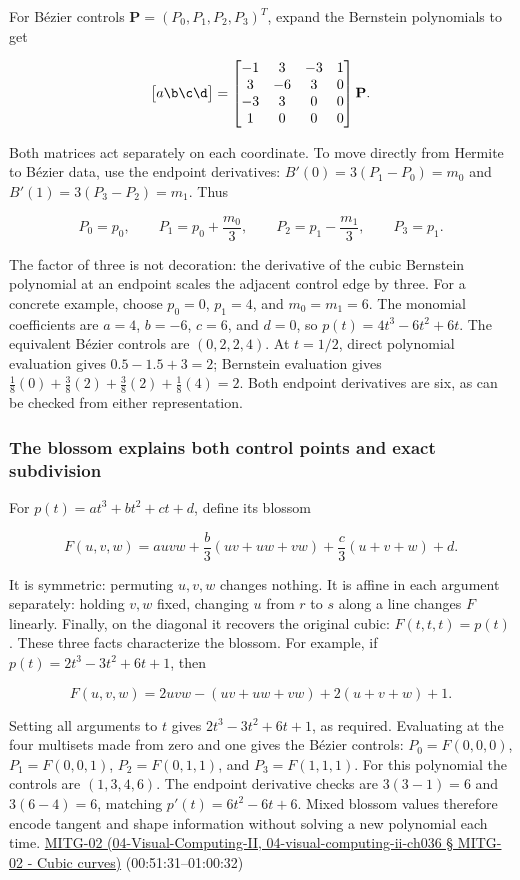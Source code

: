 For Bézier controls \(\mathbf{P}=(P_0,P_1,P_2,P_3)^T\), expand the Bernstein polynomials to get

\[
\begin{bmatrix}a\b\c\d\end{bmatrix}=
\begin{bmatrix}
-1&3&-3&1\\
3&-6&3&0\\
-3&3&0&0\\
1&0&0&0
\end{bmatrix}\mathbf{P}.
\]

Both matrices act separately on each coordinate. To move directly from Hermite to Bézier data, use the endpoint derivatives: \(B'(0)=3(P_1-P_0)=m_0\) and \(B'(1)=3(P_3-P_2)=m_1\). Thus

\[
P_0=p_0,\qquad P_1=p_0+\frac{m_0}{3},\qquad
P_2=p_1-\frac{m_1}{3},\qquad P_3=p_1.
\]

The factor of three is not decoration: the derivative of the cubic Bernstein polynomial at an endpoint scales the adjacent control edge by three. For a concrete example, choose \(p_0=0\), \(p_1=4\), and \(m_0=m_1=6\). The monomial coefficients are \(a=4\), \(b=-6\), \(c=6\), and \(d=0\), so \(p(t)=4t^3-6t^2+6t\). The equivalent Bézier controls are \((0,2,2,4)\). At \(t=1/2\), direct polynomial evaluation gives \(0.5-1.5+3=2\); Bernstein evaluation gives \(\frac18(0)+\frac38(2)+\frac38(2)+\frac18(4)=2\). Both endpoint derivatives are six, as can be checked from either representation.

\subsubsection{The blossom explains both control points and exact subdivision}\label{the-blossom-explains-both-control-points-and-exact-subdivision}

For \(p(t)=at^3+bt^2+ct+d\), define its blossom

\[
F(u,v,w)=a uvw+\frac b3(uv+uw+vw)+\frac c3(u+v+w)+d.
\]

It is symmetric: permuting \(u,v,w\) changes nothing. It is affine in each argument separately: holding \(v,w\) fixed, changing \(u\) from \(r\) to \(s\) along a line changes \(F\) linearly. Finally, on the diagonal it recovers the original cubic: \(F(t,t,t)=p(t)\). These three facts characterize the blossom. For example, if \(p(t)=2t^3-3t^2+6t+1\), then

\[
F(u,v,w)=2uvw-(uv+uw+vw)+2(u+v+w)+1.
\]

Setting all arguments to \(t\) gives \(2t^3-3t^2+6t+1\), as required. Evaluating at the four multisets made from zero and one gives the Bézier controls: \(P_0=F(0,0,0)\), \(P_1=F(0,0,1)\), \(P_2=F(0,1,1)\), and \(P_3=F(1,1,1)\). For this polynomial the controls are \((1,3,4,6)\). The endpoint derivative checks are \(3(3-1)=6\) and \(3(6-4)=6\), matching \(p'(t)=6t^2-6t+6\). Mixed blossom values therefore encode tangent and shape information without solving a new polynomial each time. \href{}{MITG-02 (04-Visual-Computing-II, 04-visual-computing-ii-ch036 § MITG-02 - Cubic curves)} (00:51:31--01:00:32)

